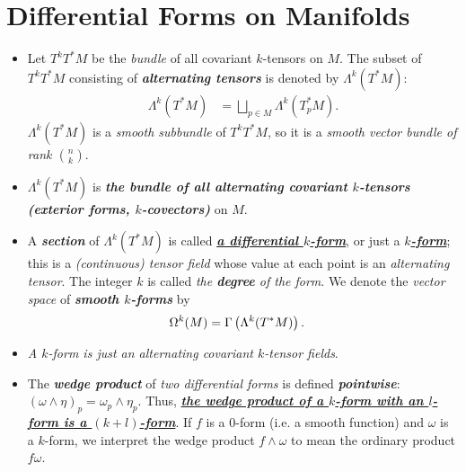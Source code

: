 \documentclass[11pt]{article}
\begin{document}
\section{Differential Forms on Manifolds}
\begin{itemize}
\item \begin{definition} 
Let $T^kT^{*}M$ be the \emph{bundle} of all covariant $k$-tensors on $M$. The subset of $T^kT^{*}M$ consisting of \emph{\textbf{alternating tensors}} is denoted by $\Lambda^k(T^{*}M)$:
\begin{align*}
\Lambda^k(T^{*}M) &= \bigsqcup_{p\in M}\Lambda^k(T_{p}^{*}M).
\end{align*}  $\Lambda^k(T^{*}M)$ is a \emph{smooth subbundle} of $T^{k}T^{*}M$, so it is a \emph{smooth vector bundle of rank $n \choose k$}.
\end{definition}

\item \begin{remark}
$\Lambda^k(T^{*}M)$ is \emph{\textbf{the bundle of all alternating covariant $k$-tensors (exterior forms, $k$-covectors)}} on $M$.  
\end{remark}

\item \begin{definition}
A \emph{\textbf{section}} of $\Lambda^k(T^{*}M)$ is called \underline{\emph{\textbf{a differential $k$-form}}}, or just a \underline{\emph{\textbf{$k$-form}}}; this is
a \emph{(continuous) tensor field} whose value at each point is an \emph{alternating tensor}. The integer $k$ is called \emph{the \textbf{degree} of the form}. We denote the \emph{vector space} of \emph{\textbf{smooth $k$-forms}} by
\begin{align*}
\Omega^{k}(M) &= \Gamma\left(\Lambda^k(T^{*}M)\right).
\end{align*}
\end{definition}

\item \begin{remark}
\textit{A $k$-form is just an alternating covariant $k$-tensor fields}. 
\end{remark}

\item \begin{remark}
The \emph{\textbf{wedge product}} of \emph{two differential forms} is defined \emph{\textbf{pointwise}}: $(\omega \wedge \eta)_p = \omega_p \wedge \eta_p$. Thus, \underline{\emph{\textbf{the wedge product of a $k$-form with an $l$-form is a $(k +l)$-form}}}. If $f$ is a $0$-form (i.e. a smooth function) and $\omega$ is a $k$-form, we interpret the wedge product  $f\wedge \omega$ to mean the ordinary product $f\omega$.
\end{remark}


\end{itemize}
\end{document}
